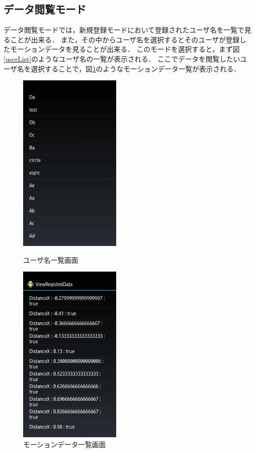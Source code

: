 \documentclass[11pt]{jreport}
\begin{document}
	    \subsection{データ閲覧モード}
	    データ閲覧モードでは，新規登録モードにおいて登録されたユーザ名を一覧で見ることが出来る．
        また，その中からユーザ名を選択するとそのユーザが登録したモーションデータを見ることが出来る．
        このモードを選択すると，まず図\ref{userList}のようなユーザ名の一覧が表示される．
        ここでデータを閲覧したいユーザ名を選択することで，図\ref{dataList}のようなモーションデータ一覧が表示される．

        \begin{figure}[tbp]
            \begin{minipage}{0.5\hsize}
                \begin{center}
                    \includegraphics[width=5cm, bb=0 0 540 960]{UserList.pdf}
                \end{center}
                \caption{ユーザ名一覧画面}
                \label{userList}
            \end{minipage}
            \begin{minipage}{0.5\hsize}
                \begin{center}
                    \includegraphics[width=5cm, bb=0 0 540 960]{DataList.pdf}
                \end{center}
                \caption{モーションデータ一覧画面}
                \label{dataList}
            \end{minipage}
        \end{figure}
\end{document}
